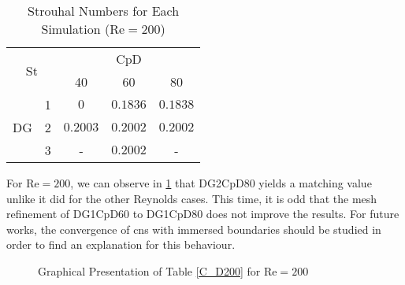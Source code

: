 \begin{table}[htp]
	\centering
	\def\arraystretch{1.5}
	\begin{tabular}{|c|c|c|c|c|}
		\hline
		\multicolumn{2}{|c|}{\multirow{2}{*}{St}} & \multicolumn{3}{c|}{CpD} \\ \cline{3-5} 
		\multicolumn{2}{|c|}{}                       & 40     & 60    & 80    \\ \hline
		\multirow{3}{*}{DG}            & 1           &    $0$    &    $0.1836$   &    $0.1838$    \\ \cline{2-5} 
		& 2           &     $0.2003$   &    $0.2002$   &     $0.2002$   \\ \cline{2-5} 
		& 3           &     -   &    $0.2002$   &    -    \\ \hline
	\end{tabular}
	\caption{Strouhal Numbers for Each Simulation ($\text{Re} = 200$)}	
	\label{Str200}
\end{table}
\newpage
For $\text{Re}=200$, we can observe in \cref{fig:C_D200} that DG2CpD80 yields a matching value unlike it did for the other Reynolds cases. This time, it is odd that the mesh refinement of DG1CpD60 to DG1CpD80 does not improve the results. For future works, the convergence of \gls{cns} with immersed boundaries should be studied in order to find an explanation for this behaviour.
\begin{figure}[htp]	
	\vspace{-0.5cm}
	\centering
	\caption{Graphical Presentation of Table \ref{C_D200} for $\text{Re} = 200$}
	\label{fig:C_D200}	
\end{figure}

